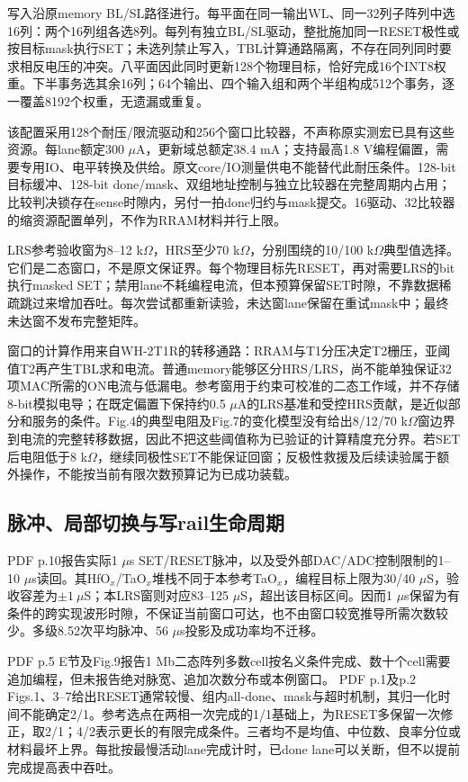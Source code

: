 写入沿原memory BL/SL路径进行。每平面在同一输出WL、同一32列子阵列中选16列：两个16列组各选8列。每列有独立BL/SL驱动，整批施加同一RESET极性或按目标mask执行SET；未选列禁止写入，TBL计算通路隔离，不存在同列同时要求相反电压的冲突。八平面因此同时更新128个物理目标，恰好完成16个INT8权重。下半事务选其余16列；64个输出、四个输入组和两个半组构成512个事务，逐一覆盖8192个权重，无遗漏或重复。

该配置采用128个耐压/限流驱动和256个窗口比较器，不声称原实测宏已具有这些资源。每lane额定300 $\mu$A，更新域总额定38.4 mA；支持最高1.8 V编程偏置，需要专用IO、电平转换及供给。原文core/IO测量供电不能替代此耐压条件。128-bit目标缓冲、128-bit done/mask、双组地址控制与独立比较器在完整周期内占用；比较判决锁存在sense时隙内，另付一拍done归约与mask提交。16驱动、32比较器的缩资源配置单列，不作为RRAM材料并行上限。

LRS参考验收窗为8--12 k$\Omega$，HRS至少70 k$\Omega$，分别围绕的10/100 k$\Omega$典型值选择。它们是二态窗口，不是原文保证界。每个物理目标先RESET，再对需要LRS的bit执行masked SET；禁用lane不耗编程电流，但本预算保留SET时隙，不靠数据稀疏跳过来增加吞吐。每次尝试都重新读验，未达窗lane保留在重试mask中；最终未达窗不发布完整矩阵。

窗口的计算作用来自WH-2T1R的转移通路：RRAM与T1分压决定T2栅压，亚阈值T2再产生TBL求和电流。普通memory能够区分HRS/LRS，尚不能单独保证32项MAC所需的ON电流与低漏电。参考窗用于约束可校准的二态工作域，并不存储8-bit模拟电导；在既定偏置下保持约0.5 $\mu$A的LRS基准和受控HRS贡献，是近似部分和服务的条件。Fig.4的典型电阻及Fig.7的变化模型没有给出8/12/70 k$\Omega$窗边界到电流的完整转移数据，因此不把这些阈值称为已验证的计算精度充分界。若SET后电阻低于8 k$\Omega$，继续同极性SET不能保证回窗；反极性救援及后续读验属于额外操作，不能按当前有限次数预算记为已成功装载。

\subsection{脉冲、局部切换与写rail生命周期}

 PDF p.10报告实际1 $\mu$s SET/RESET脉冲，以及受外部DAC/ADC控制限制的1--10 $\mu$s读回。其HfO$_x$/TaO$_x$堆栈不同于本参考TaO$_x$，编程目标上限为30/40 $\mu$S，验收容差为$\pm1\ \mu$S；本LRS窗则对应83--125 $\mu$S，超出该目标区间。因而1 $\mu$s保留为有条件的跨实现波形时隙，不保证当前窗口可达，也不由窗口较宽推导所需次数较少。多级8.52次平均脉冲、56 $\mu$s投影及成功率均不迁移。

 PDF p.5 E节及Fig.9报告1 Mb二态阵列多数cell按名义条件完成、数十个cell需要追加编程，但未报告绝对脉宽、追加次数分布或本例窗口。 PDF p.1及p.2 Figs.1、3--7给出RESET通常较慢、组内all-done、mask与超时机制，其归一化时间不能确定2/1。参考选点在两相一次完成的1/1基础上，为RESET多保留一次修正，取2/1；4/2表示更长的有限完成条件。三者均不是均值、中位数、良率分位或材料最坏上界。每批按最慢活动lane完成计时，已done lane可以关断，但不以提前完成提高表中吞吐。

